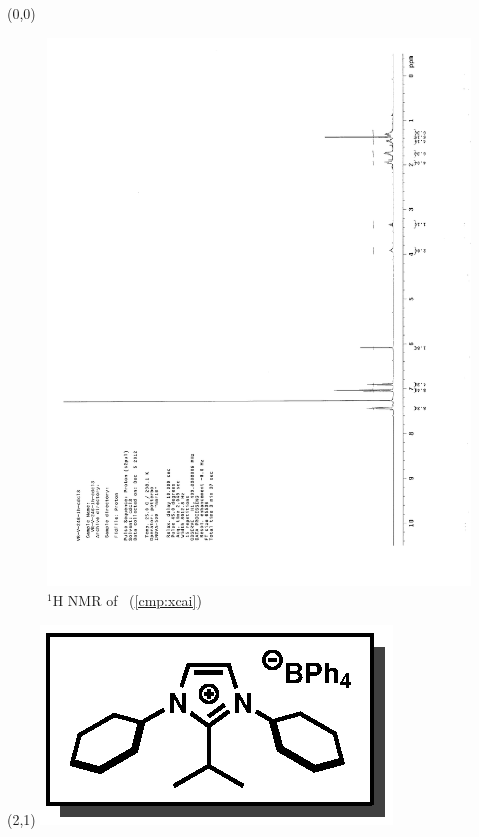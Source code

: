 \begin{textblock}{20}(0,0)
\begin{figure}[htb]
\caption{$^1$H NMR of \CMPxcai\ (\ref{cmp:xcai})}
\includegraphics[scale=0.75, trim = 0mm 0mm 0mm 5mm,
clip]{chp_alkylation/images/nmr/xcaiH}
\vspace{-100pt}
\end{figure}
\end{textblock}
\begin{textblock}{1}(2,1)
\includegraphics[scale=0.8, angle=90]{chp_alkylation/images/xcai}
\end{textblock}
